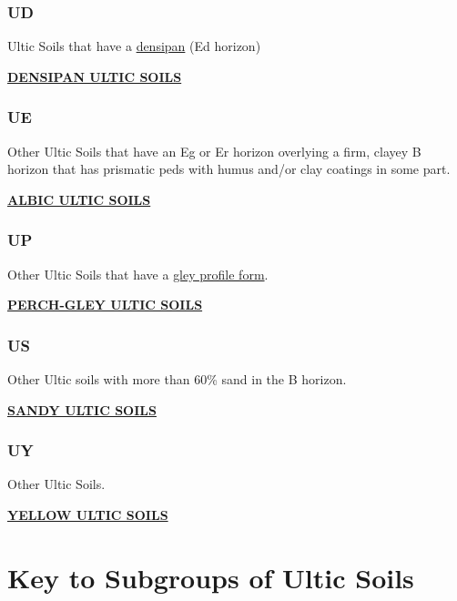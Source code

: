 \documentclass[
  letterpaper,
  DIV=11,
  numbers=noendperiod]{scrreprt}
\begin{document}
\hypertarget{sec-key-UD}{%
\subsubsection{\texorpdfstring{\textbf{UD}}{UD}}\label{sec-key-UD}}

Ultic Soils that have a \protect\hyperlink{sec-diag-dens}{densipan} (Ed
horizon)

\protect\hyperlink{sec-UD}{\textbf{DENSIPAN ULTIC SOILS}}

\hypertarget{sec-key-UE}{%
\subsubsection{\texorpdfstring{\textbf{UE}}{UE}}\label{sec-key-UE}}

Other Ultic Soils that have an Eg or Er horizon overlying a firm, clayey
B horizon that has prismatic peds with humus and/or clay coatings in
some part.

\protect\hyperlink{sec-UE}{\textbf{ALBIC ULTIC SOILS}}

\hypertarget{sec-key-UP}{%
\subsubsection{\texorpdfstring{\textbf{UP}}{UP}}\label{sec-key-UP}}

Other Ultic Soils that have a \protect\hyperlink{sec-diag-gleypf}{gley
profile form}.

\protect\hyperlink{sec-UP}{\textbf{PERCH-GLEY ULTIC SOILS}}

\hypertarget{sec-key-US}{%
\subsubsection{\texorpdfstring{\textbf{US}}{US}}\label{sec-key-US}}

Other Ultic soils with more than 60\% sand in the B horizon.

\protect\hyperlink{sec-US}{\textbf{SANDY ULTIC SOILS}}

\hypertarget{sec-key-UY}{%
\subsubsection{\texorpdfstring{\textbf{UY}}{UY}}\label{sec-key-UY}}

Other Ultic Soils.

\protect\hyperlink{sec-UY}{\textbf{YELLOW ULTIC SOILS}}

\hypertarget{sec-sub-U}{%
\section{Key to Subgroups of Ultic Soils}\label{sec-sub-U}}
\end{document}
